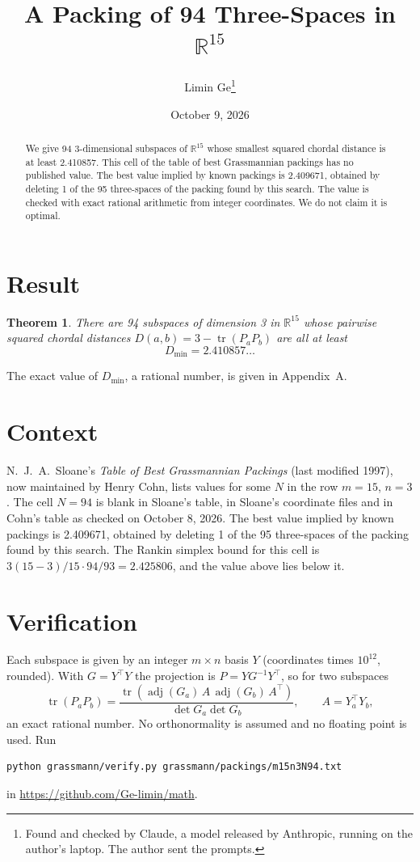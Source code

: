 \documentclass[11pt,a4paper]{article}
\title{A Packing of 94 Three-Spaces in $\mathbb{R}^{15}$}
\author{Limin Ge\thanks{Found and checked by Claude, a model released by Anthropic, running on the author's laptop. The author sent the prompts.}}
\date{October 9, 2026}
\newtheorem*{theorem}{Theorem}
\begin{document}
\maketitle
\begin{abstract}
We give 94 3-dimensional subspaces of $\mathbb{R}^{15}$ whose smallest squared chordal distance is at least 2.410857. This cell of the table of best Grassmannian packings has no published value. The best value implied by known packings is 2.409671, obtained by deleting 1 of the 95 three-spaces of the packing found by this search. The value is checked with exact rational arithmetic from integer coordinates. We do not claim it is optimal.
\end{abstract}

\section{Result}
\begin{theorem}
There are 94 subspaces of dimension 3 in $\mathbb{R}^{15}$ whose pairwise squared chordal distances $D(a,b) = 3 - \operatorname{tr}(P_aP_b)$ are all at least
\[ D_{\min} = 2.410857\ldots \]
\end{theorem}
The exact value of $D_{\min}$, a rational number, is given in Appendix~A.


\section{Context}
N.~J.~A.~Sloane's \emph{Table of Best Grassmannian Packings} (last modified 1997), now maintained by Henry Cohn, lists values for some $N$ in the row $m=15$, $n=3$. The cell $N=94$ is blank in Sloane's table, in Sloane's coordinate files and in Cohn's table as checked on October 8, 2026. The best value implied by known packings is 2.409671, obtained by deleting 1 of the 95 three-spaces of the packing found by this search. The Rankin simplex bound for this cell is $3(15-3)/15\cdot 94/93 = 2.425806$, and the value above lies below it.


\section{Verification}
Each subspace is given by an integer $m\times n$ basis $Y$ (coordinates times $10^{12}$, rounded). With $G=Y^\top Y$ the projection is $P=YG^{-1}Y^\top$, so for two subspaces
\[ \operatorname{tr}(P_aP_b)=\frac{\operatorname{tr}(\operatorname{adj}(G_a)\,A\,\operatorname{adj}(G_b)\,A^\top)}{\det G_a\det G_b},\qquad A=Y_a^\top Y_b, \]
an exact rational number. No orthonormality is assumed and no floating point is used. Run
\begin{verbatim}
python grassmann/verify.py grassmann/packings/m15n3N94.txt
\end{verbatim}
in \url{https://github.com/Ge-limin/math}.
\end{document}
